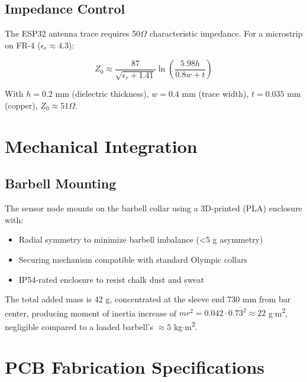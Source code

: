 \subsection{Impedance Control}

The ESP32 antenna trace requires 50$\Omega$ characteristic impedance. For a microstrip on FR-4 ($\epsilon_r \approx 4.3$):

\begin{equation}
    Z_0 \approx \frac{87}{\sqrt{\epsilon_r + 1.41}} \ln\left(\frac{5.98h}{0.8w + t}\right)
\end{equation}

With $h = 0.2$ mm (dielectric thickness), $w = 0.4$ mm (trace width), $t = 0.035$ mm (copper), $Z_0 \approx 51\Omega$.

\section{Mechanical Integration}

\subsection{Barbell Mounting}

The sensor node mounts on the barbell collar using a 3D-printed (PLA) enclosure with:
\begin{itemize}
    \item Radial symmetry to minimize barbell imbalance (<5 g asymmetry)
    \item Securing mechanism compatible with standard Olympic collars
    \item IP54-rated enclosure to resist chalk dust and sweat
    \end{itemize}

The total added mass is 42 g, concentrated at the sleeve end 730 mm from bar center, producing moment of inertia increase of $m r^2 = 0.042 \cdot 0.73^2 \approx 22$ g$\cdot$m\textsuperscript{2}, negligible compared to a loaded barbell's $\approx 5$ kg$\cdot$m\textsuperscript{2}.

\section{PCB Fabrication Specifications}


